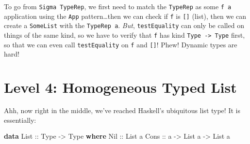 \documentclass[]{article}
\newenvironment{Shaded}{}{}
\newcommand{\CommentTok}[1]{\textcolor[rgb]{0.38,0.63,0.69}{\textit{#1}}}
\newcommand{\DataTypeTok}[1]{\textcolor[rgb]{0.56,0.13,0.00}{#1}}
\newcommand{\FunctionTok}[1]{\textcolor[rgb]{0.02,0.16,0.49}{#1}}
\newcommand{\KeywordTok}[1]{\textcolor[rgb]{0.00,0.44,0.13}{\textbf{#1}}}
\newcommand{\NormalTok}[1]{#1}
\newcommand{\OperatorTok}[1]{\textcolor[rgb]{0.40,0.40,0.40}{#1}}
\newcommand{\OtherTok}[1]{\textcolor[rgb]{0.00,0.44,0.13}{#1}}
\begin{document}
To go from \texttt{Sigma\ TypeRep}, we first need to match the \texttt{TypeRep}
as some \texttt{f\ a} application using the \texttt{App} pattern\ldots then we
can check if \texttt{f} is \texttt{{[}{]}} (list), then we can create a
\texttt{SomeList} with the \texttt{TypeRep\ a}. \emph{But},
\texttt{testEquality} can only be called on things of the same kind, so we have
to verify that \texttt{f} has kind \texttt{Type\ -\textgreater{}\ Type} first,
so that we can even call \texttt{testEquality} on \texttt{f} and
\texttt{{[}{]}}! Phew! Dynamic types are hard!

\begin{Shaded}
\end{Shaded}

\section{Level 4: Homogeneous Typed List}\label{level-4-homogeneous-typed-list}

Ahh, now right in the middle, we've reached Haskell's ubiquitous list type! It
is essentially:

\begin{Shaded}
\begin{Highlighting}[]
\KeywordTok{data} \DataTypeTok{List}\OtherTok{ ::} \DataTypeTok{Type} \OtherTok{{-}\textgreater{}} \DataTypeTok{Type} \KeywordTok{where}
    \DataTypeTok{Nil}\OtherTok{  ::} \DataTypeTok{List}\NormalTok{ a}
    \DataTypeTok{Cons}\OtherTok{ ::}\NormalTok{ a }\OtherTok{{-}\textgreater{}} \DataTypeTok{List}\NormalTok{ a }\OtherTok{{-}\textgreater{}} \DataTypeTok{List}\NormalTok{ a}
\end{Highlighting}
\end{Shaded}
\end{document}
